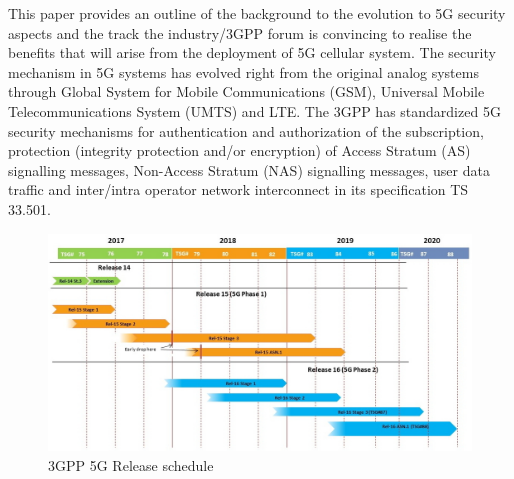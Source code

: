 \begin{multicols}{2}
This paper provides an outline of the background to the evolution to 5G security aspects and the track the industry/3GPP forum is convincing to realise the benefits that will arise from the deployment of 5G cellular system. The security mechanism in 5G systems has evolved right from the original analog systems through Global System for Mobile Communications (GSM), Universal Mobile Telecommunications System (UMTS) and LTE. The 3GPP \cite{art4-key01} has standardized 5G security mechanisms for authentication and authorization of the subscription, protection (integrity protection and/or encryption) of Access Stratum (AS) signalling messages, Non-Access Stratum (NAS) signalling messages, user data traffic and inter/intra operator network interconnect in its specification TS 33.501\cite{art4-key03}.
\end{multicols}

\setcounter{figure}{0}
\begin{figure}[H]
\centering
\includegraphics[scale=1.92]{src/Figures/chap4/chap4-fig01.jpg}
\caption{3GPP 5G Release schedule\cite{art4-key01}}\label{chap4-fig01}
\end{figure}

